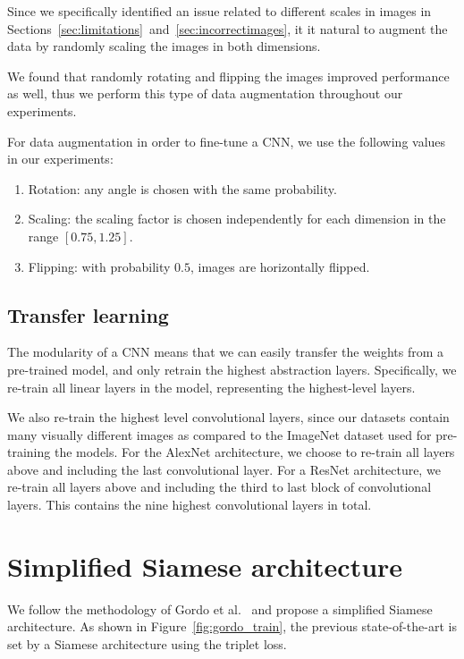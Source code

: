 Since we specifically identified an issue related to different scales
in images in Sections~\ref{sec:limitations}~and~\ref{sec:incorrectimages},
it it natural to augment the data by randomly scaling the images in both
dimensions.

We found that randomly rotating and flipping the images improved
performance as well, thus we perform this type of data augmentation
throughout our experiments.

For data augmentation in order to fine-tune a CNN, we use the
following values in our experiments:
\begin{enumerate}
    \item Rotation: any angle is chosen with the same probability.
    \item Scaling: the scaling factor is chosen independently for each
    dimension in the range $[0.75,1.25]$.
    \item Flipping: with probability $0.5$, images are horizontally
    flipped.
\end{enumerate}

\subsection{Transfer learning}
The modularity of a CNN means that we can easily transfer
the weights from a pre-trained model, and only retrain the highest
abstraction layers. Specifically, we re-train all linear layers in the
model, representing the highest-level layers.

We also re-train the highest level convolutional layers, since our datasets
contain many visually different images as compared to the ImageNet
dataset used for pre-training the models.
For the AlexNet architecture, we choose to re-train all layers above
and including the last convolutional layer.
For a ResNet architecture, we re-train all layers above and including the
third to last block of convolutional layers. This contains the
nine highest convolutional layers in total.

\section{Simplified Siamese architecture}\label{sec:simplifiedsiam}
We follow the methodology of Gordo et al.~\cite{gordo_deep_2016} and
propose a simplified Siamese architecture. As shown in
Figure~\ref{fig:gordo_train}, the previous state-of-the-art is set
by a Siamese architecture using the triplet loss.

